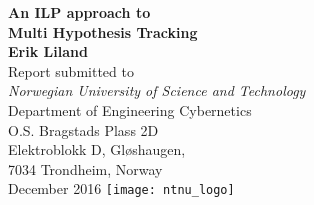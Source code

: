 \begin{titlepage}
\begin{center}
 {\huge\bfseries An ILP approach to \\ Multi Hypothesis Tracking\\}
 \vspace{1.5cm}
 {\Large\bfseries Erik Liland}\\[5pt]
\vspace{2cm} 
{Report  submitted to} \\[5pt]
\emph{{Norwegian University of Science and Technology}}\\[2cm]

 \vfill
{Department of Engineering Cybernetics}\\[5pt]
{O.S. Bragstads Plass 2D}\\[5pt]
{Elektroblokk D, Gløshaugen,\\
7034 Trondheim, Norway}\\
\vfill
{December 2016}
\vfill
\texttt{[image: ntnu\_logo]}\\[5pt]
\end{center}
\end{titlepage}
\clearpage
\newpage